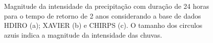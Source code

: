 \documentclass[
]{agujournal2019}
\begin{document}
\begin{figure}
\begin{minipage}{\linewidth}
{}


\end{minipage}%
\newline
\begin{minipage}{\linewidth}



\end{minipage}%

\caption{\label{fig-Figura3}Magnitude da intensidade da precipitação com
duração de 24 horas para o tempo de retorno de 2 anos considerando a
base de dados HDIRO (a); XAVIER (b) e CHIRPS (c). O tamanho dos circulos
azuis indica a magnitude da intensidade das chuvas.}

\end{figure}%
\end{document}
